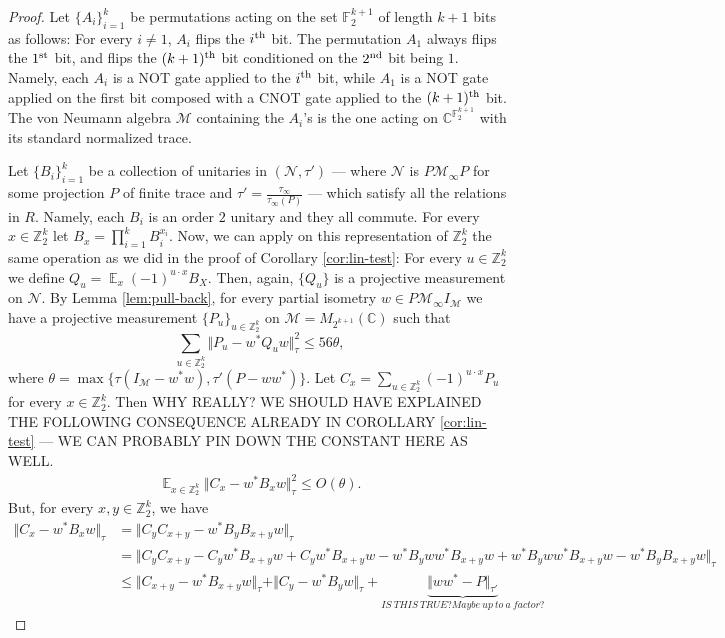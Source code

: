 \documentclass[11pt]{article}
\theoremstyle{definition}
\newcommand{\Id}{\ensuremath{I}}
\DeclareMathOperator*{\Expectation}{\mathbb{E}}
\newcommand{\field}{\mathbb{F}_2}
\newcommand{\complex}{\ensuremath{\mathbb{C}}}
\newcommand{\Z}{\ensuremath{\mathbb{Z}}}
\newcommand{\mM}{\ensuremath{\mathcal{M}}}
\newcommand{\mN}{\mathcal{N}}
\begin{document}
\begin{proof}
Let $\{A_i\}_{i=1}^k$ be permutations acting on the set $\field^{k+1}$ of length $k+1$ bits as follows: For every $i\neq 1$, $A_i$ flips the $i^{\rm th}$ bit. The permutation $A_1$ always flips the $1^{\rm st}$ bit, and  flips the $(k+1)^{\rm th}$ bit conditioned on the $2^{\rm nd}$ bit being $1$. Namely, each $A_i$ is a NOT gate applied to  the $i^{\rm th}$ bit, while $A_1$ is a NOT gate applied on the first bit composed with a CNOT gate applied to the $(k+1)^{\rm th}$ bit. The von Neumann algebra $\mM$ containing the $A_i$'s is the one acting on $\complex^{\field^{k+1}}$ with its standard normalized trace.

Let $\{B_i\}_{i=1}^k$ be a collection of unitaries in $(\mN,\tau')$ --- where $\mN$ is $P\mM_\infty P$  for some projection $P$ of finite trace and $\tau'=\frac{\tau_\infty}{\tau_\infty(P)}$ --- which satisfy all the relations in $R$. Namely, each $B_i$ is an order $2$ unitary and they all commute. For every $x\in \Z_2^k$ let  $B_x=\prod_{i=1}^kB_i^{x_i}$. Now, we can apply on this representation of $\Z_2^k$ the same operation as we did in the proof of Corollary \ref{cor:lin-test}: For every $u\in \Z_2^k$ we define $Q_u=\Expectation_x(-1)^{u\cdot x}B_X$. Then, again, $\{Q_u\}$ is a projective measurement on $\mN$. By Lemma \ref{lem:pull-back}, for every partial isometry $w\in P\mM_\infty \Id_\mM$ we have a projective measurement $\{P_u\}_{u\in \Z_2^k}$  on $\mM=M_{2^{k+1}}(\complex)$ such that 
\[
\sum_{u\in \Z_2^k}\Vert P_u -w^*Q_uw\Vert_\tau^2\leq 56\theta,
\]
where $\theta=\max\{\tau(\Id_\mM-w^*w),\tau'(P-ww^*)\}$.
Let $C_x=\sum_{u\in \Z_2^k}(-1)^{u\cdot x}P_u$ for every $x\in \Z_2^k$. Then {\color{red} WHY REALLY? WE SHOULD HAVE EXPLAINED THE FOLLOWING CONSEQUENCE ALREADY IN COROLLARY \ref{cor:lin-test} --- WE CAN PROBABLY PIN DOWN THE CONSTANT HERE AS WELL.}
\[
\begin{split}
 \Expectation_{x\in \Z_2^k}\Vert C_x-w^*B_xw\Vert_\tau^2\leq O(\theta).
\end{split}
\]
But, for every $x,y\in \Z_2^k$, we have
\[
\begin{split}
    \Vert C_x-w^*B_xw\Vert_\tau&=\Vert C_yC_{x+y}-w^*B_yB_{x+y}w\Vert_\tau\\
    &=\Vert C_yC_{x+y}-C_yw^*B_{x+y}w+C_yw^*B_{x+y}w-w^*B_yww^*B_{x+y}w +w^*B_yww^*B_{x+y}w-w^*B_yB_{x+y}w\Vert_\tau\\
    &\leq \Vert C_{x+y}-w^*B_{x+y}w\Vert_\tau+\Vert C_y-w^*B_yw\Vert_\tau+\underbrace{\Vert ww^*-P\Vert_{\tau'}}_{IS\ THIS\ TRUE? Maybe\ up\ to\ a\ factor?}
\end{split}
\]
\end{proof}
\end{document}

